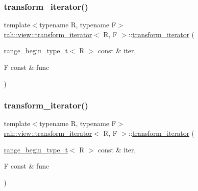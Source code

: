 \subsubsection{\texorpdfstring{transform\_iterator()}{transform\_iterator()}\hspace{0.1cm}{\footnotesize\ttfamily [1/2]}}
{\footnotesize\ttfamily template$<$typename R, typename F$>$ \\
\mbox{\hyperlink{structrah_1_1view_1_1transform__iterator}{rah\+::view\+::transform\+\_\+iterator}}$<$ R, F $>$\+::\mbox{\hyperlink{structrah_1_1view_1_1transform__iterator}{transform\+\_\+iterator}} (\begin{DoxyParamCaption}\item[{\mbox{\hyperlink{namespacerah_a28aff4eeddcece6be65ff0b956d32d4a}{range\+\_\+begin\+\_\+type\+\_\+t}}$<$ R $>$ const \&}]{iter,  }\item[{F const \&}]{func }\end{DoxyParamCaption})\hspace{0.3cm}{\ttfamily [inline]}}

\mbox{\label{structrah_1_1view_1_1transform__iterator_ae8f127be961b14896c87d94e710a9a1a}} 
\subsubsection{\texorpdfstring{transform\_iterator()}{transform\_iterator()}\hspace{0.1cm}{\footnotesize\ttfamily [2/2]}}
{\footnotesize\ttfamily template$<$typename R, typename F$>$ \\
\mbox{\hyperlink{structrah_1_1view_1_1transform__iterator}{rah\+::view\+::transform\+\_\+iterator}}$<$ R, F $>$\+::\mbox{\hyperlink{structrah_1_1view_1_1transform__iterator}{transform\+\_\+iterator}} (\begin{DoxyParamCaption}\item[{\mbox{\hyperlink{namespacerah_a28aff4eeddcece6be65ff0b956d32d4a}{range\+\_\+begin\+\_\+type\+\_\+t}}$<$ R $>$ const \&}]{iter,  }\item[{F const \&}]{func }\end{DoxyParamCaption})\hspace{0.3cm}{\ttfamily [inline]}}



